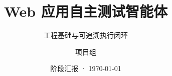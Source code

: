 \documentclass[aspectratio=169,fontset=fandol]{ctexbeamer}
\title[Web 应用自主测试]{Web 应用自主测试智能体}
\subtitle{工程基础与可追溯执行闭环}
\author{项目组}
\institute{WebAppAutoTestAgent}
\date{阶段汇报 · \today}
\begin{document}
\begin{frame}\titlepage\end{frame}






\end{document}

